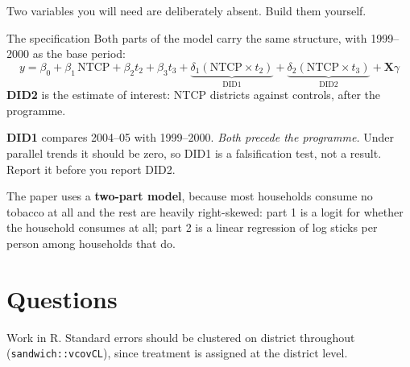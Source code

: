 \documentclass[11pt,a4paper]{article}
\begin{document}
Two variables you will need are deliberately absent. Build them yourself.

\begin{notebox}{The specification}
Both parts of the model carry the same structure, with 1999--2000 as the base
period:
\[
  y = \beta_0 + \beta_1\,\text{NTCP} + \beta_2 t_2 + \beta_3 t_3
      + \underbrace{\delta_1 (\text{NTCP}\times t_2)}_{\text{DID1}}
      + \underbrace{\delta_2 (\text{NTCP}\times t_3)}_{\text{DID2}}
      + \mathbf{X}\gamma
\]
\textbf{DID2} is the estimate of interest: NTCP districts against controls,
after the programme.

\textbf{DID1} compares 2004--05 with 1999--2000. \emph{Both precede the
programme.} Under parallel trends it should be zero, so DID1 is a falsification
test, not a result. Report it before you report DID2.

The paper uses a \textbf{two-part model}, because most households consume no
tobacco at all and the rest are heavily right-skewed:
part 1 is a logit for whether the household consumes at all; part 2 is a linear
regression of log sticks per person among households that do.
\end{notebox}

\clearpage
\section*{Questions}

Work in R. Standard errors should be clustered on district throughout
(\texttt{sandwich::vcovCL}), since treatment is assigned at the district level.
\end{document}

